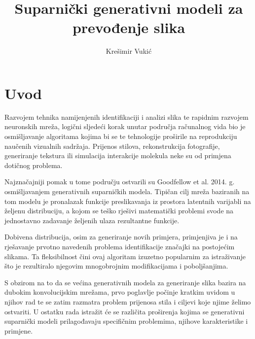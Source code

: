 \documentclass[lmodern, utf8, seminar]{fer}
\begin{document}
\nocite{*}



\title{Suparnički generativni modeli za prevođenje slika}

\author{Krešimir Vukić}

\maketitle


\tableofcontents




\chapter{Uvod}
Razvojem tehnika namijenjenih identifikaciji i analizi slika te rapidnim razvojem neuronskih mreža, logični sljedeći korak unutar područja računalnog vida bio je osmišljavanje algoritama kojima bi se te tehnologije proširile na reprodukciju naučenih vizualnih sadržaja. 
Prijenos stilova, rekonstrukcija fotografije, generiranje tekstura ili simulacija interakcije molekula neke su od primjena dotičnog problema.
\newline

Najznačajniji pomak u tome području ostvarili su Goodfellow et al. 2014. g. \cite{goodfellow2014generative} osmišljavanjem generativnih suparničkih modela. Tipičan cilj mreža baziranih na tom modelu je pronalazak funkcije preslikavanja iz prostora latentnih varijabli na željenu distribuciju, a kojom se teško rješivi matematički problemi svode na jednostavno zadavanje željenih ulaza rezultantne funkcije.
\newline

Dobivena distribucija, osim za generiranje novih primjera, primjenjiva je i na rješavanje prvotno navedenih problema identifikacije značajki na postojećim slikama. Ta fleksibilnost čini ovaj algoritam izuzetno popularnim za istraživanje što je rezultiralo njegovim mnogobrojnim modifikacijama i poboljšanjima.
\newline

S obzirom na to da se većina  generativnih modela za generiranje slika bazira na dubokim konvolucijskim mrežama, prvo poglavlje počinje kratkim uvidom u njihov rad te se zatim razmatra problem prijenosa stila i ciljevi koje njime želimo ostvariti.
U ostatku rada istražit će se različita proširenja kojima se generativni suparnički modeli prilagođavaju specifičnim problemima, njihove karakteristike i primjene. 
\end{document}
